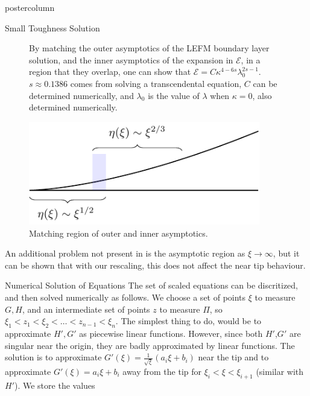 \documentclass{beamer}
\newcommand{\cE}{\mathcal{E}}                               %
\begin{document}
\begin{frame}
\begin{columns}
\begin{column}{.57\textwidth}
\begin{beamercolorbox}[center]{postercolumn}
\begin{minipage}{.98\textwidth}
{\begin{myblock}{Small Toughness Solution}
\begin{figure}
\begin{minipage}{.52\textwidth}
By matching the outer asymptotics of the LEFM boundary layer solution, and
the inner asymptotics of the expansion in $\cE$, in a region that they overlap,
one can show that $\cE = C \kappa^{4-6s}\lambda_0^{2s-1}$. $s \approx 0.1386$
comes from solving a transcendental equation, $C$ can be determined numerically,
and $\lambda_0$ is the value of $\lambda$ when $\kappa=0$, also determined
numerically.
\end{minipage}
\begin{minipage}{.45\textwidth}
\centering\includegraphics[width=0.9\textwidth]{Fig7.pdf}
\caption{Matching region of outer and inner asymptotics.}
\end{minipage}
\end{figure}
An additional problem not present in \cite{GandD} is the asymptotic region
as $\xi\to \infty$, but it can be shown that with our rescaling, this does
not affect the near tip behaviour.
\end{myblock}\vfill
\begin{myblock}{Numerical Solution of Equations}
The set of scaled equations can be discritized, and then solved numerically
as follows. We choose a set of points $\xi$ to measure $G,H$, and an 
intermediate set of points $z$ to measure $\Pi$, so $\xi_1 < z_1 < \xi_2 <
\dots < z_{n-1} < \xi_n$.
The simplest thing to do, would be to approximate $H',G'$ as piecewise linear
functions. However, since both $H'$,$G'$ are singular near the origin, they
are badly approximated by linear functions.
The solution is to approximate $G'(\xi) = \frac{1}{\sqrt{\xi}}(a_i \xi + b_i)$
near the tip and to approximate $G'(\xi) = a_i \xi + b_i$ away from the tip 
for $\xi_i < \xi < \xi_{i+1}$ (similar with $H'$). We store the values 

\end{myblock}}
\end{minipage}
\end{beamercolorbox}
\end{column}
\end{columns}
\end{frame}
\end{document}
